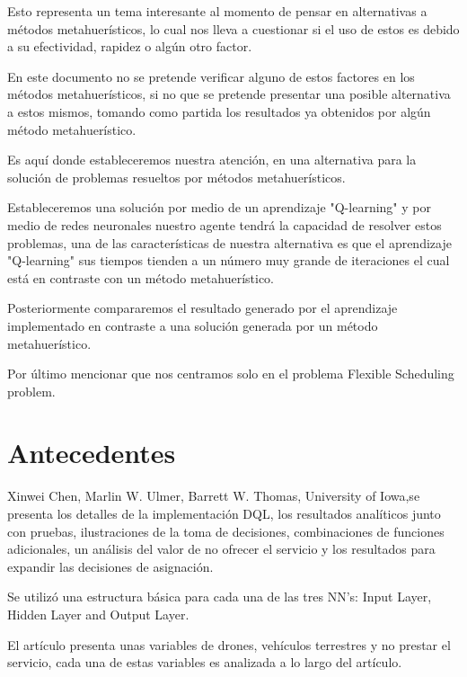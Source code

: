 \documentclass[letterpaper, 10 pt]{article}
\begin{document}
Esto representa un tema interesante al momento de pensar en alternativas a métodos metahuerísticos, lo cual nos lleva a cuestionar si el uso de estos es debido a su efectividad, rapidez o algún otro factor.


En este documento no se pretende verificar alguno de estos factores en los métodos metahuerísticos, si no que se pretende presentar una posible alternativa a estos mismos, tomando como partida los resultados ya obtenidos por algún método metahuerístico.


Es aquí donde estableceremos nuestra atención, en una alternativa para la solución de problemas resueltos por métodos metahuerísticos.

Estableceremos una solución por medio de un aprendizaje "Q-learning" y por medio de redes neuronales nuestro agente tendrá la capacidad de resolver estos problemas, una de las características de nuestra alternativa es que el aprendizaje "Q-learning" sus tiempos tienden a un número muy grande de iteraciones el cual está en contraste con un método metahuerístico.

Posteriormente compararemos el resultado generado por el aprendizaje implementado en contraste a una solución generada por un método metahuerístico.

Por último mencionar que nos centramos  solo en el problema  Flexible Scheduling problem.

\section*{Antecedentes}
Xinwei Chen, Marlin W. Ulmer, Barrett W. Thomas, University of Iowa,se presenta los detalles de la implementación DQL, los resultados analíticos junto con pruebas, ilustraciones de la toma de decisiones, combinaciones de funciones adicionales, un análisis del valor de no ofrecer el servicio y los resultados para expandir las decisiones de asignación.


Se utilizó una estructura básica para cada una de las tres NN's: Input Layer, Hidden Layer and Output Layer.

El artículo presenta unas variables de drones, vehículos terrestres y no prestar el servicio, cada una de estas variables es analizada a lo largo del artículo.
\end{document}
